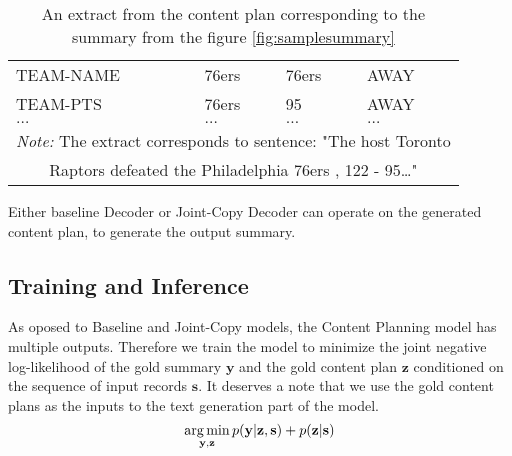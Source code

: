 \begin{table}
\begin{tabular}{llll}
        TEAM-NAME                                             & 76ers                                                 & 76ers                                                 & AWAY                                                  \\
        TEAM-PTS                                              & 76ers                                                 & 95                                                    & AWAY                                                  \\
        $\dots$                                               & $\dots$                                               & $\dots$                                               & $\dots$ \\                                        
        \bottomrule
        \multicolumn{4}{c}{\footnotesize \textit{Note:} The extract corresponds to sentence: "The host Toronto} \\
        \multicolumn{4}{c}{\footnotesize Raptors defeated the Philadelphia 76ers , 122 - 95\dots "}
    \end{tabular}
    \caption{An extract from the content plan corresponding to the summary from the figure \ref{fig:samplesummary}}
\end{table}

Either baseline Decoder or Joint-Copy Decoder can operate on the generated content plan, to generate the output summary.

\subsection{Training and Inference}

As oposed to Baseline and Joint-Copy models, the Content Planning model has multiple outputs. Therefore we train the model to minimize the joint negative log-likelihood of the gold summary $\mathbf{y}$ and the gold content plan $\mathbf{z}$ conditioned on the sequence of input records $\mathbf{s}$. It deserves a note that we use the gold content plans as the inputs to the text generation part of the model.
\begin{equation}
    \operatorname*{arg\,min}_{\mathbf{y}, \mathbf{z}}{p(\mathbf{y}|\mathbf{z}, \mathbf{s}) + p(\mathbf{z} | \mathbf{s})}
\end{equation}
